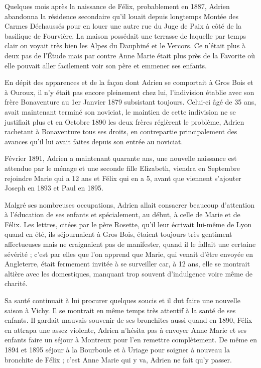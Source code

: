 \documentclass[11pt,a4paper]{report}
\begin{document}

Quelques mois après la naissance de Félix, probablement en 1887, Adrien abandonna la résidence secondaire qu'il louait depuis longtemps Montée des Carmes Déchaussés pour en louer une autre rue du Juge de Paix à côté de la basilique de Fourvière. La maison possédait une terrasse de laquelle par temps clair on voyait très bien les Alpes du Dauphiné et le Vercors. Ce n'était plus à deux pas de l'Étude mais par contre Anne Marie était plus près de la Favorite où elle pouvait aller facilement voir son père et emmener ses enfants.

En dépit des apparences et de la façon dont Adrien se comportait à Gros Bois et à Ouroux, il n'y était pas encore pleinement chez lui, l'indivision établie avec son frère Bonaventure au 1er Janvier 1879 subsistant toujours. Celui-ci âgé de 35 ans, avait maintenant terminé son noviciat, le maintien de cette indivision ne se justifiait plus et en Octobre 1890 les deux frères réglèrent le problème, Adrien rachetant à Bonaventure tous ses droits, en contrepartie principalement des avances qu'il lui avait faites depuis son entrée au noviciat.

Février 1891, Adrien a maintenant quarante ans, une nouvelle naissance est attendue par le ménage et une seconde fille Elizabeth, viendra en Septembre rejoindre Marie qui a 12 ans et Félix qui en a 5, avant que viennent s'ajouter Joseph en 1893 et Paul en 1895.

Malgré ses nombreuses occupations, Adrien allait consacrer beaucoup d'attention à l'éducation de ses enfants et spécialement, au début, à celle de Marie et de Félix. Les lettres, citées par le père Rosette, qu'il leur écrivait lui-même de Lyon quand en été, ils séjournaient à Gros Bois, étaient toujours très gentiment affectueuses mais ne craignaient pas de manifester, quand il le fallait une certaine sévérité ; c'est par elles que l'on apprend que Marie, qui venait d'être envoyée en Angleterre, était fermement invitée à se surveiller car, à 12 ans, elle se montrait altière avec les domestiques, manquant trop souvent d'indulgence voire même de charité.

Sa santé continuait à lui procurer quelques soucis et il dut faire une nouvelle saison à Vichy. Il se montrait en même temps très attentif à la santé de ses enfants. Il gardait mauvais souvenir de ses bronchites aussi quand en 1890, Félix en attrapa une assez violente, Adrien n'hésita pas à envoyer Anne Marie et ses enfants faire un séjour à Montreux pour l'en remettre complètement. De même en 1894 et 1895 séjour à la Bourboule et à Uriage pour soigner à nouveau la bronchite de Félix ; c'est Anne Marie qui y va, Adrien ne fait qu'y passer.
\end{document}
